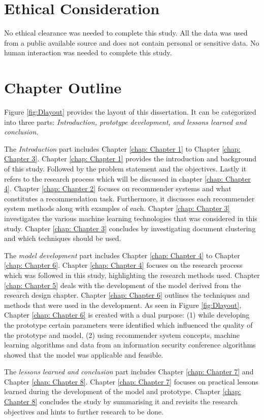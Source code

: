 \section{Ethical Consideration}
No ethical clearance was needed to complete this study. All the data was used from a public available source and does not contain personal or sensitive data. No human interaction was needed to complete this study.

\section{Chapter Outline}
Figure \ref{fig:Dlayout} provides the layout of this dissertation. It can be categorized into three parts: 
\textit{Introduction, prototype development, and lessons learned and conclusion.}

The \textit{Introduction} part includes Chapter \ref{chap: Chapter 1} to Chapter \ref{chap: Chapter 3}.
Chapter \ref{chap: Chapter 1} provides the introduction and background of this study. Followed by the problem statement and the objectives. Lastly it refers to the research process which will be discussed in chapter \ref{chap: Chapter 4}. Chapter \ref{chap: Chapter 2} focuses on recommender systems and what constitutes a recommendation task. Furthermore, it discusses each recommender system methods along with examples of each. Chapter \ref{chap: Chapter 3} investigates the various machine learning technologies that was considered in this study. Chapter \ref{chap: Chapter 3} concludes by investigating document clustering and which techniques should be used.

The \textit{model development} part includes Chapter \ref{chap: Chapter 4} to Chapter \ref{chap: Chapter 6}.
Chapter \ref{chap: Chapter 4} focuses on the research process which was followed in this study, highlighting the research methods used.
Chapter \ref{chap: Chapter 5} deals with the development of the model derived from the research design chapter. Chapter \ref{chap: Chapter 6} outlines the techniques and methods that were used in the development.
As seen in Figure \ref{fig:Dlayout}, Chapter \ref{chap: Chapter 6} is created with a dual purpose: (1) while developing the prototype certain parameters were identified which influenced the quality of the prototype and model, (2) using recommender system concepts, machine learning algorithms and data from an information security conference algorithms showed that the model was applicable and feasible. 

The \textit{lessons learned and conclusion} part includes Chapter \ref{chap: Chapter 7} and Chapter \ref{chap: Chapter 8}. 
Chapter \ref{chap: Chapter 7} focuses on practical lessons learned during the development of the model and prototype. Chapter \ref{chap: Chapter 8} concludes the study by summarising it and revisits the research objectives and hints to further research to be done.

